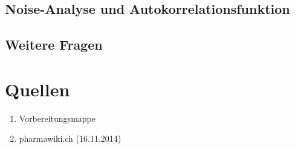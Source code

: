 \documentclass[a4paper,ngerman]{scrartcl}
\begin{document}
\subsection{Noise-Analyse und Autokorrelationsfunktion}
\label{sec:noise-autocorr}

\subsection{Weitere Fragen}
\label{sec:weitere-fragen}















\section{Quellen}
\begin{enumerate}
\item Vorbereitungsmappe \label{ref:mappe}
\item pharmawiki.ch (16.11.2014) \label{ref:pharmawiki}
\end{enumerate}
\end{document}
